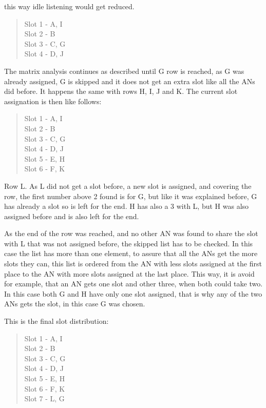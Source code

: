 \begin{itemize}
this way idle listening would get reduced.
 \begin{quote}
  Slot 1 - A, I \\ Slot 2 - B \\ Slot 3 - C, G \\ Slot 4 - D, J
 \end{quote}
The matrix analysis continues as described until G row is reached, as G was already assigned, G is skipped and it does not get an extra 
slot like all the \acp{AN} did before. It happens the same with rows H, I, J and K. The current slot assignation is then like follows:
 \begin{quote}
  Slot 1 - A, I \\ Slot 2 - B \\ Slot 3 - C, G \\ Slot 4 - D, J \\ Slot 5 - E, H \\ Slot 6 - F, K
 \end{quote}
Row L. As L did not get a slot before, a new slot is assigned, and covering the row, the first number above 2 found is for G, but
like it was explained before, G has already a slot so is left for the end. H has also a 3 with L, but H was also assigned before and is also 
left for the end.

As the end of the row was reached, and no other \ac{AN} was found to share the slot with L that was not assigned before, the skipped list has
to be checked. In this case the list has more than one element, to assure that all the \acp{AN} get the more slots they can, this list is 
ordered from the \ac{AN} with less slots assigned at the first place to the \ac{AN} with more slots assigned at the last place. This way, it is
avoid for example, that an \ac{AN} gets one slot and other three, when both could take two. In this case both G and H have only one slot 
assigned, that is why any of the two \acp{AN} gets the slot, in this case G was chosen.

This is the final slot distribution:
 \begin{quote}
  Slot 1 - A, I \\ Slot 2 - B \\ Slot 3 - C, G \\ Slot 4 - D, J \\ Slot 5 - E, H \\ Slot 6 - F, K \\ Slot 7 - L, G
 \end{quote}
\end{itemize}

